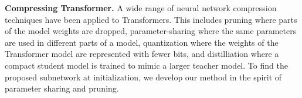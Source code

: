 \noindent\textbf{Compressing Transformer.} A wide range of neural network compression techniques have been applied to Transformers. 
This includes pruning  \citep{fan2019reducing,michel2019sixteen,sanh2020movement,yao2021mlpruning} where parts of the model weights are dropped, parameter-sharing \citep{lan2020albert,dehghani2018universal,bai2019deep} where the same
parameters are used in different parts of a model, quantization \citep{shen2020q,li2020train}
where the weights of the Transformer model are represented with fewer bits, and distilliation \citep{sun2020mobilebert,jiao2020tinybert} where a compact student model is trained to mimic a larger teacher model. 
To find the proposed subnetwork at initialization, we develop our method in the spirit of parameter sharing and pruning. 

\usepackage[utf8]{inputenc} %
\usepackage[T1]{fontenc}    %
\usepackage{url}            %
\usepackage{booktabs}       %
\usepackage{amsfonts}       %
\usepackage{nicefrac}       %
\usepackage{microtype}      %
\usepackage{times}
\usepackage{soul}
\usepackage[utf8]{inputenc}
\usepackage{graphicx}
\usepackage{amsmath}
\usepackage{booktabs}
\usepackage{adjustbox}





\usepackage{graphicx}
\usepackage{subfigure}
\usepackage{booktabs} %


% 

\usepackage{multirow}
\usepackage{paralist}

\usepackage{booktabs} %
\usepackage{multicol}
\usepackage{diagbox}

\usepackage[ruled,noend]{algorithm2e}
\newcommand{\theHalgorithm}{\arabic{algorithm}}
\newcommand\mycommfont[1]{\scriptsize\ttfamily\textcolor{blue}{#1}}

\usepackage{here}

\usepackage{amsmath,amssymb,amsfonts,amsbsy,amsfonts,latexsym}
\usepackage{multirow}
\usepackage{makecell}
\usepackage{xcolor}
\usepackage{colortbl}
\let\proof\relax
\let\endproof\relax


